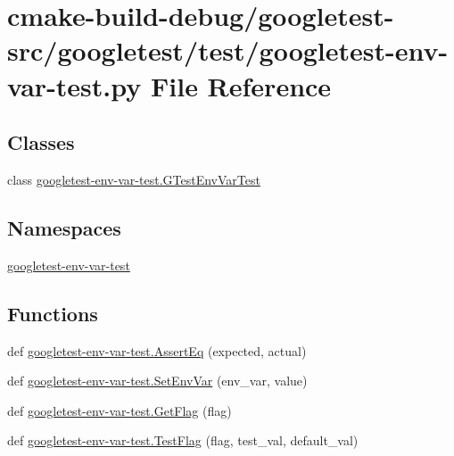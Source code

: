 \hypertarget{googletest-env-var-test_8py}{}\section{cmake-\/build-\/debug/googletest-\/src/googletest/test/googletest-\/env-\/var-\/test.py File Reference}
\label{googletest-env-var-test_8py}
\subsection*{Classes}
\begin{DoxyCompactItemize}
\item 
class \mbox{\hyperlink{classgoogletest-env-var-test_1_1GTestEnvVarTest}{googletest-\/env-\/var-\/test.\+G\+Test\+Env\+Var\+Test}}
\end{DoxyCompactItemize}
\subsection*{Namespaces}
\begin{DoxyCompactItemize}
\item 
 \mbox{\hyperlink{namespacegoogletest-env-var-test}{googletest-\/env-\/var-\/test}}
\end{DoxyCompactItemize}
\subsection*{Functions}
\begin{DoxyCompactItemize}
\item 
def \mbox{\hyperlink{namespacegoogletest-env-var-test_a1dc4462bd3778a92f77f63296bb2a805}{googletest-\/env-\/var-\/test.\+Assert\+Eq}} (expected, actual)
\item 
def \mbox{\hyperlink{namespacegoogletest-env-var-test_a4445af183e70fbd62bf4903ec7447fe6}{googletest-\/env-\/var-\/test.\+Set\+Env\+Var}} (env\+\_\+var, value)
\item 
def \mbox{\hyperlink{namespacegoogletest-env-var-test_a5e599696d970929ff7836e5329e1350f}{googletest-\/env-\/var-\/test.\+Get\+Flag}} (flag)
\item 
def \mbox{\hyperlink{namespacegoogletest-env-var-test_a7b8631f31d258198990b9a6004faa8a7}{googletest-\/env-\/var-\/test.\+Test\+Flag}} (flag, test\+\_\+val, default\+\_\+val)
\end{DoxyCompactItemize}
